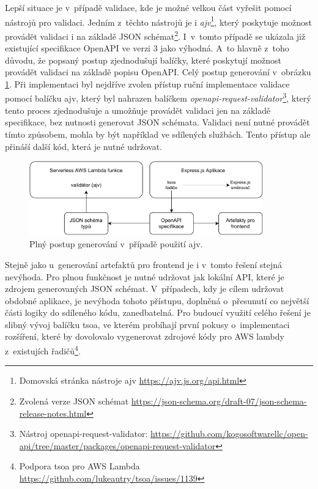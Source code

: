 Lepší situace je v~případě validace, kde je možné velkou část vyřešit pomocí nástrojů pro validaci. Jedním z~těchto nástrojů je i \textit{ajv}\footnote{Domovská stránka nástroje ajv \url{https://ajv.js.org/api.html}}, který poskytuje možnost provádět validaci i na základě JSON schémat\footnote{Zvolená verze JSON schémat \url{https://json-schema.org/draft-07/json-schema-release-notes.html}}. I~v~tomto případě se ukázala již existující specifikace OpenAPI ve verzi 3 jako výhodná. A~to hlavně z~toho důvodu, že popsaný postup zjednodušují balíčky, které poskytují možnost provádět validaci na základě popisu OpenAPI. Celý postup generování v~obrázku \ref{generation-proces}. Při implementaci byl nejdříve zvolen přístup ruční implementace validace pomocí balíčku ajv, který byl nahrazen balíčkem \textit{openapi-request-validator}\footnote{Nástroj openapi-request-validator: \url{https://github.com/kogosoftwarellc/open-api/tree/master/packages/openapi-request-validator}}, který tento proces zjednodušuje a umožňuje provádět validaci jen na základě specifikace, bez nutnosti generovat JSON schémata. Validaci není nutné provádět tímto způsobem, mohla by být například ve sdílených službách. Tento přístup ale přináší další kód, která je nutné udržovat.

\begin{figure}[H]
\label{generation-proces}
\begin{center}
    \includegraphics[width=0.9\textwidth]{obrazky-figures/generation-proces.pdf}
\end{center}
\caption{Plný postup generování v~případě použití ajv.}
\end{figure}

Stejně jako u~generování artefaktů pro frontend je i v~tomto řešení stejná nevýhoda. Pro plnou funkčnost je nutné udržovat jak lokální API, které je zdrojem generovaných JSON schémat. V~případech, kdy je cílem udržovat obdobné aplikace, je nevýhoda tohoto přístupu, doplněná o~přesunutí co největší části logiky do sdíleného kódu, zanedbatelná. Pro budoucí využití celého řešení je slibný vývoj balíčku tsoa, ve kterém probíhají první pokusy o~implementaci rozšíření, které by dovolovalo vygenerovat zdrojové kódy pro AWS lambdy z~existujích řadičů\footnote{Podpora tsoa pro AWS Lambda \url{https://github.com/lukeautry/tsoa/issues/1139}}.

